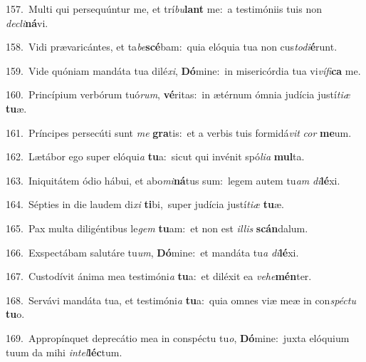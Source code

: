 {\numbfont\textcolor{\numbcolor}{157.}}~Multi qui persequúntur me, et trí\-\textit{bu}\-\textbf{lant} me:~\star a testimóniis tuis non \textit{de}\-\textit{cli}\textbf{ná}vi.\par
{\numbfont\textcolor{\numbcolor}{158.}}~Vidi prævaricántes, et ta\-\textit{be}\-\textbf{scé}bam:~\star quia elóquia tua non cus\-\textit{to}\-\textit{di}\textbf{é}runt.\par
{\numbfont\textcolor{\numbcolor}{159.}}~Vide quóniam mandáta tua dilé\-\textit{xi}\-, \textbf{Dó}\-mine:~\star in misericórdia tua vi\-\textit{ví}\-\textit{fi}\textbf{ca} me.\par
{\numbfont\textcolor{\numbcolor}{160.}}~Princípium verbórum tuó\-\textit{rum}\-, \textbf{vé}\-ritas:~\star in ætérnum ómnia judícia justí\-\textit{ti}\-\textit{æ} \textbf{tu}\-æ.\par
{\numbfont\textcolor{\numbcolor}{161.}}~Príncipes persecúti sunt \textit{me} \textbf{gra}\-tis:~\star et a verbis tuis formidá\textit{vit} \textit{cor} \textbf{me}\-um.\par
{\numbfont\textcolor{\numbcolor}{162.}}~Lætábor ego super elóqui\textit{a} \textbf{tu}\-a:~\star sicut qui invénit spó\-\textit{li}\-\textit{a} \textbf{mul}\-ta.\par
{\numbfont\textcolor{\numbcolor}{163.}}~Iniquitátem ódio hábui, et abo\-\textit{mi}\-\textbf{ná}tus sum:~\star legem autem tu\textit{am} \textit{di}\-\textbf{lé}xi.\par
{\numbfont\textcolor{\numbcolor}{164.}}~Sépties in die laudem di\textit{xi} \textbf{ti}\-bi,~\star super judícia justí\-\textit{ti}\-\textit{æ} \textbf{tu}\-æ.\par
{\numbfont\textcolor{\numbcolor}{165.}}~Pax multa diligéntibus le\textit{gem} \textbf{tu}\-am:~\star et non est \textit{il}\-\textit{lis} \textbf{scán}\-dalum.\par
{\numbfont\textcolor{\numbcolor}{166.}}~Exspectábam salutáre tu\-\textit{um}\-, \textbf{Dó}\-mine:~\star et mandáta tu\textit{a} \textit{di}\-\textbf{lé}xi.\par
{\numbfont\textcolor{\numbcolor}{167.}}~Custodívit ánima mea testimóni\textit{a} \textbf{tu}\-a:~\star et diléxit ea \textit{ve}\-\textit{he}\textbf{mén}ter.\par
{\numbfont\textcolor{\numbcolor}{168.}}~Servávi mandáta tua, et testimóni\textit{a} \textbf{tu}\-a:~\star quia omnes viæ meæ in con\-\textit{spéc}\-\textit{tu} \textbf{tu}\-o.\par
{\numbfont\textcolor{\numbcolor}{169.}}~Appropínquet deprecátio mea in conspéctu tu\-\textit{o}\-, \textbf{Dó}\-mine:~\star juxta elóquium tuum da mihi \textit{in}\-\textit{tel}\textbf{léc}tum.\par
